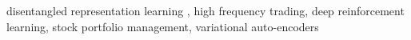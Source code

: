 \documentclass[preprint,review,12pt]{elsarticle}
\begin{document}
\begin{frontmatter}


\begin{keyword}
	disentangled representation learning \sep
    high frequency trading\sep
    deep reinforcement learning\sep
	stock portfolio management\sep
	variational auto-encoders
	
\end{keyword}

\end{frontmatter}

\linenumbers
\end{document}
